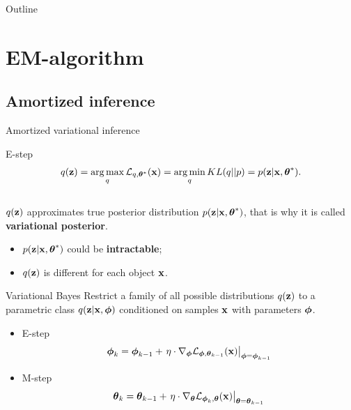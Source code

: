 \begin{frame}{Outline}
	\tableofcontents
\end{frame}
\section{EM-algorithm}
\subsection{Amortized inference}
\begin{frame}{Amortized variational inference}
	\begin{block}{E-step}
		\vspace{-0.3cm}
		\[
		q(\mathbf{z}) = \operatorname*{arg\,max}_q \mathcal{L}_{q, \boldsymbol{\theta}^*}(\mathbf{x}) = \operatorname*{arg\,min}_q KL(q || p) =
		p(\mathbf{z}| \mathbf{x}, \boldsymbol{\theta}^*).
		\]
		\vspace{-0.3cm} \\
		$q(\mathbf{z})$ approximates true posterior distribution $p(\mathbf{z}| \mathbf{x}, \boldsymbol{\theta}^*)$, that is why it is called \textbf{variational posterior}.
		\begin{itemize}
			\item {\color{violet}$p(\mathbf{z}| \mathbf{x}, \boldsymbol{\theta}^*)$ could be \textbf{intractable}};
			\item {\color{teal}$q(\mathbf{z})$ is different for each object $\mathbf{x}$}.
		\end{itemize}
	\end{block}
	\begin{block}{Variational Bayes}
		Restrict a family of all possible distributions $q(\mathbf{z})$ to a parametric class $q(\mathbf{z}|\mathbf{x}, \boldsymbol{\phi})$  {\color{teal}conditioned on samples $\mathbf{x}$}  {\color{violet}with parameters $\boldsymbol{\phi}$}.
		\begin{itemize}
			\item E-step
			\[
				\boldsymbol{\phi}_k = \boldsymbol{\phi}_{k-1} + \left.\eta \cdot \nabla_{\boldsymbol{\phi}} \mathcal{L}_{\boldsymbol{\phi}, \boldsymbol{\theta}_{k-1}}(\mathbf{x})\right|_{\boldsymbol{\phi}=\boldsymbol{\phi}_{k-1}}
			\]
			\item M-step
			\[
				\boldsymbol{\theta}_k = \boldsymbol{\theta}_{k-1} + \left.\eta \cdot \nabla_{\boldsymbol{\theta}} \mathcal{L}_{\boldsymbol{\phi}_k, \boldsymbol{\theta}}(\mathbf{x})\right|_{\boldsymbol{\theta}=\boldsymbol{\theta}_{k-1}}
			\]
		\end{itemize}
	\end{block}
\end{frame}
